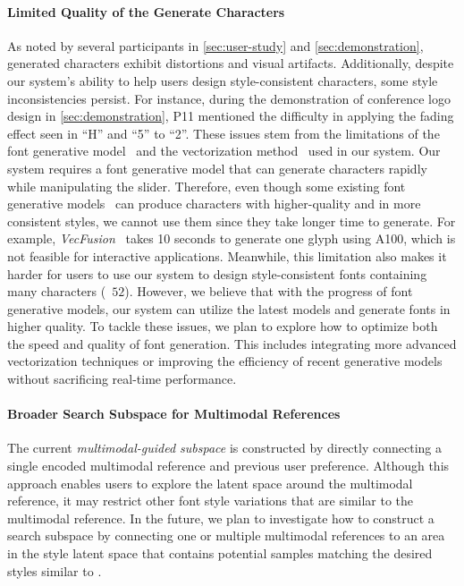\paragraph{Limited Quality of the Generate Characters}
As noted by several participants in \autoref{sec:user-study} and \autoref{sec:demonstration}, generated characters exhibit distortions and visual artifacts.
Additionally, despite our system's ability to help users design style-consistent characters, some style inconsistencies persist.
For instance, during the demonstration of conference logo design in \autoref{sec:demonstration}, P11 mentioned the difficulty in applying the fading effect seen in ``H'' and ``5'' to ``2''.
These issues stem from the limitations of the font generative model~\cite{XieDGFont2021} and the vectorization method~\cite{selinger2003potrace} used in our system.
Our system requires a font generative model that can generate characters rapidly while manipulating the slider.
Therefore, even though some existing font generative models~\cite{liu2023dualvector,fu2024MSD, he2024difffont, liu2024qtfont,thamizharasan2024vecfusion} can produce characters with higher-quality and in more consistent styles, we cannot use them since they take longer time to generate.
For example, \textit{VecFusion}~\cite{thamizharasan2024vecfusion} takes 10 seconds to generate one glyph using A100, which is not feasible for interactive applications.
Meanwhile, this limitation also makes it harder for users to use our system to design style-consistent fonts containing many characters (\eg~$52$).
However, we believe that with the progress of font generative models, our system can utilize the latest models and generate fonts in higher quality.
To tackle these issues, we plan to explore how to optimize both the speed and quality of font generation. 
This includes integrating more advanced vectorization techniques or improving the efficiency of recent generative models without sacrificing real-time performance.

\paragraph{Broader Search Subspace for Multimodal References}
The current \textit{multimodal-guided subspace} is constructed by directly connecting a single encoded multimodal reference and previous user preference.
Although this approach enables users to explore the latent space around the multimodal reference, it may restrict other font style variations that are similar to the multimodal reference.
In the future, we plan to investigate how to construct a search subspace by connecting one or multiple multimodal references to an area in the style latent space that contains potential samples matching the desired styles similar to \cite{KoyamaGallery2020}.

